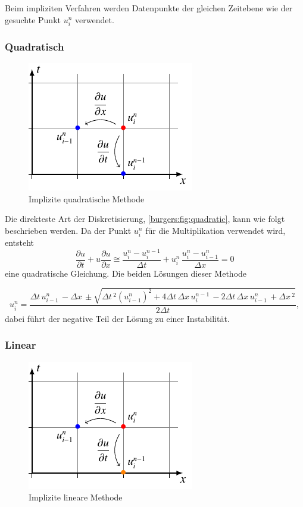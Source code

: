 	Beim impliziten Verfahren werden Datenpunkte der gleichen Zeitebene wie der gesuchte Punkt $u_{i}^{n}$ verwendet.


\subsubsection{Quadratisch}
     \begin{figure}
	\centering
	\includegraphics[height=.4\textwidth]{papers/burgers/BurgersEquation/tikz/quadratic/quadratic.pdf}
	\caption{Implizite quadratische Methode}
	\label{burgers:fig:quadratic}
	\end{figure}

	Die direkteste Art der Diskretisierung, \autoref{burgers:fig:quadratic}, kann wie folgt beschrieben werden.
	Da der Punkt $u_{i}^{n}$ f\"ur die Multiplikation verwendet wird, entsteht
	\begin{equation}
	\frac {\partial u}{\partial t}+u{\frac {\partial u}{\partial x}} \cong \frac{u_{i}^{n}-u_{i}^{n-1}}{\Delta t}+ u_{i}^{n}\, \frac{u_{i}^{n}-u_{i-1}^{n}}{\Delta x}=0
	\end{equation}
	eine quadratische Gleichung.
	Die beiden L\"osungen dieser Methode

	\begin{equation}
	  u_{i}^{n} =
	     \dfrac{\Delta{t}\, u^{n}_{i-1}\, - \Delta{x}\, \pm \sqrt{\Delta{t}\,^{2} (u^{n}_{i-1})^{2} + 4 \Delta{t}\, \Delta{x}\, u^{n-1}_{i}\, - 2 \Delta{t}\, \Delta{x}\, u^{n}_{i-1}\, + \Delta{x}\,^{2}}}{2 \Delta{t}},
	\end{equation}
	dabei f\"uhrt der negative Teil der L\"osung zu einer Instabilität.


	\subsubsection{Linear}
	\label{burgers:sec:imp_lin}
	     \begin{figure}
		\centering
		\includegraphics[height=.4\textwidth]{papers/burgers/BurgersEquation/tikz/linear5/linear5.pdf}
		\caption{Implizite lineare Methode}
		\label{burgers:fig:linear5}
		\end{figure}

